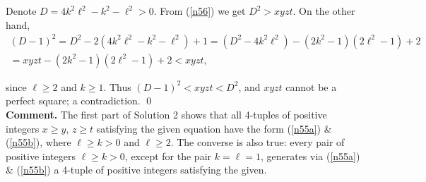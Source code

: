 \documentclass[a4paper, 12pt]{article}
\begin{document}
\begin{enumerate}
Denote $D = 4k^2 \ell^2 - k^2 - \ell^2 > 0$. From (\ref{n56}) we get $D^2 > xyzt$. On the other hand,
\begin{align*}
    (D-1)^2 = D^2 - 2(4k^2 \ell^2 - k^2 - \ell^2) + 1 = (D^2 - 4 k^2 \ell^2) - (2k^2 - 1)(2 \ell^2 - 1) + 2 \\
    = xyzt - (2k^2-1)(2 \ell^2 - 1) + 2 < xyzt,
\end{align*}

since $\ell \geq 2$ and $k \geq 1$. Thus $(D-1)^2 < xyzt < D^2$, and $xyzt$ cannot be a perfect square; a contradiction. \qed \\

\textbf{Comment. } The first part of Solution 2 shows that all 4-tuples of positive integers $x \geq y$, $z \geq t$ satisfying the given equation have the form (\ref{n55a}) \& (\ref{n55b}), where $\ell \geq k > 0$ and $\ell \geq 2$. The converse is also true: every pair of positive integers $\ell \geq k > 0$, except for the pair $k = \ell = 1$, generates via (\ref{n55a}) \& (\ref{n55b}) a 4-tuple of positive integers satisfying the given.



\vspace{6mm}


    

\end{enumerate}
\end{document}

